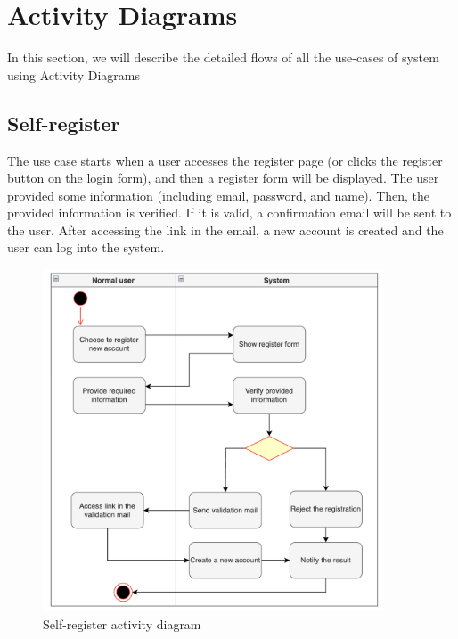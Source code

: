 \newpage
\section{Activity Diagrams}
In this section, we will describe the detailed flows of all the use-cases of system using Activity Diagrams

\subsection{Self-register}

The use case starts when a user accesses the register page (or clicks the register button on the login form), and then a register form will be displayed. The user provided some information (including email, password, and name). Then,  the provided information is verified. If it is valid, a confirmation email will be sent to the user. After accessing the link in the email, a new account is created and the user can log into the system.
\begin{figure}[H]
  \centering
  \includegraphics[width=0.9\textwidth]{Figures/self_register.png}
  \caption{Self-register activity diagram}
  \label{fig:self-registration}
\end{figure}
\newpage


